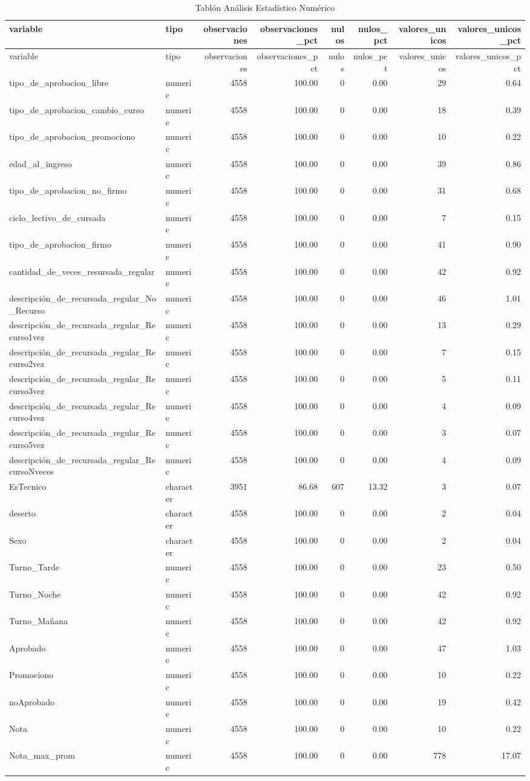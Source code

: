 \begin{longtable}[]{@{\extracolsep{\fill}}llrrrrrr@{}}

\caption{ Tablón Análisis Estadístico Numérico }\tabularnewline
\toprule
variable & tipo & observaciones & observaciones\_pct & nulos &
nulos\_pct & valores\_unicos & valores\_unicos\_pct\tabularnewline
\midrule
\endfirsthead
\toprule
variable & tipo & observaciones & observaciones\_pct & nulos &
nulos\_pct & valores\_unicos & valores\_unicos\_pct\tabularnewline
\midrule
\endhead
tipo\_de\_aprobacion\_libre & numeric & 4558 & 100.00 & 0 & 0.00 & 29 &
0.64\tabularnewline
tipo\_de\_aprobacion\_cambio\_curso & numeric & 4558 & 100.00 & 0 & 0.00
& 18 & 0.39\tabularnewline
tipo\_de\_aprobacion\_promociono & numeric & 4558 & 100.00 & 0 & 0.00 &
10 & 0.22\tabularnewline
edad\_al\_ingreso & numeric & 4558 & 100.00 & 0 & 0.00 & 39 &
0.86\tabularnewline
tipo\_de\_aprobacion\_no\_firmo & numeric & 4558 & 100.00 & 0 & 0.00 &
31 & 0.68\tabularnewline
ciclo\_lectivo\_de\_cursada & numeric & 4558 & 100.00 & 0 & 0.00 & 7 &
0.15\tabularnewline
tipo\_de\_aprobacion\_firmo & numeric & 4558 & 100.00 & 0 & 0.00 & 41 &
0.90\tabularnewline
cantidad\_de\_veces\_resursada\_regular & numeric & 4558 & 100.00 & 0 &
0.00 & 42 & 0.92\tabularnewline
descripción\_de\_recursada\_regular\_No\_Recurso & numeric & 4558 &
100.00 & 0 & 0.00 & 46 & 1.01\tabularnewline
descripción\_de\_recursada\_regular\_Recurso1vez & numeric & 4558 &
100.00 & 0 & 0.00 & 13 & 0.29\tabularnewline
descripción\_de\_recursada\_regular\_Recurso2vez & numeric & 4558 &
100.00 & 0 & 0.00 & 7 & 0.15\tabularnewline
descripción\_de\_recursada\_regular\_Recurso3vez & numeric & 4558 &
100.00 & 0 & 0.00 & 5 & 0.11\tabularnewline
descripción\_de\_recursada\_regular\_Recurso4vez & numeric & 4558 &
100.00 & 0 & 0.00 & 4 & 0.09\tabularnewline
descripción\_de\_recursada\_regular\_Recurso5vez & numeric & 4558 &
100.00 & 0 & 0.00 & 3 & 0.07\tabularnewline
descripción\_de\_recursada\_regular\_RecursoNveces & numeric & 4558 &
100.00 & 0 & 0.00 & 4 & 0.09\tabularnewline
EsTecnico & character & 3951 & 86.68 & 607 & 13.32 & 3 &
0.07\tabularnewline
deserto & character & 4558 & 100.00 & 0 & 0.00 & 2 & 0.04\tabularnewline
Sexo & character & 4558 & 100.00 & 0 & 0.00 & 2 & 0.04\tabularnewline
Turno\_Tarde & numeric & 4558 & 100.00 & 0 & 0.00 & 23 &
0.50\tabularnewline
Turno\_Noche & numeric & 4558 & 100.00 & 0 & 0.00 & 42 &
0.92\tabularnewline
Turno\_Mañana & numeric & 4558 & 100.00 & 0 & 0.00 & 42 &
0.92\tabularnewline
Aprobado & numeric & 4558 & 100.00 & 0 & 0.00 & 47 & 1.03\tabularnewline
Promociono & numeric & 4558 & 100.00 & 0 & 0.00 & 10 &
0.22\tabularnewline
noAprobado & numeric & 4558 & 100.00 & 0 & 0.00 & 19 &
0.42\tabularnewline
Nota & numeric & 4558 & 100.00 & 0 & 0.00 & 10 & 0.22\tabularnewline
Nota\_max\_prom & numeric & 4558 & 100.00 & 0 & 0.00 & 778 &
17.07\tabularnewline
\bottomrule

\end{longtable}

